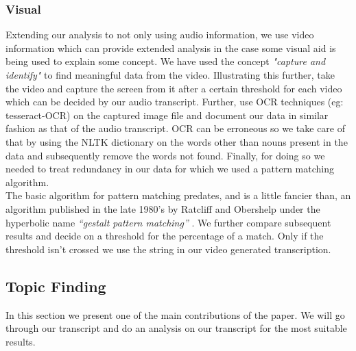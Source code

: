 \documentclass[conference]{IEEEtran}
\begin{document}
\subsubsection{Visual}
Extending our analysis to not only using audio information, we use video information which can provide extended analysis in the case some visual aid is being used to explain some concept. We have used the concept \textit{"capture and identify"} to find meaningful data from the video. Illustrating this further, take the video and capture the screen from it after a certain threshold for each video which can be decided by our audio transcript. Further, use OCR techniques (eg: tesseract-OCR) on the captured image file and document our data in similar fashion as that of the audio transcript. OCR can be erroneous so we take care of that by using the NLTK dictionary on the words other than nouns present in the data and subsequently remove the words not found. Finally, for doing so we needed to treat redundancy in our data for which we used a pattern matching algorithm.\\
\indent The basic algorithm for pattern matching predates, and is a little fancier than, an algorithm published in the late 1980’s by Ratcliff and Obershelp under the hyperbolic name \textit{“gestalt pattern matching”} \cite{b4}. We further compare subsequent results and decide on a threshold for the percentage of a match. Only if the threshold isn’t crossed we use the string in our video generated transcription.

\subsection{Topic Finding}
In this section we present one of the main contributions of the paper. We will go through our transcript and do an analysis on our transcript for the most suitable results.
\end{document}
